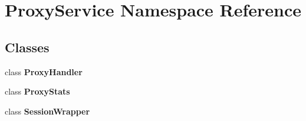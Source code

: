 \section{Proxy\+Service Namespace Reference}
\label{namespaceProxyService}
\subsection*{Classes}
\begin{DoxyCompactItemize}
\item 
class {\bf Proxy\+Handler}
\item 
class {\bf Proxy\+Stats}
\item 
class {\bf Session\+Wrapper}
\end{DoxyCompactItemize}

